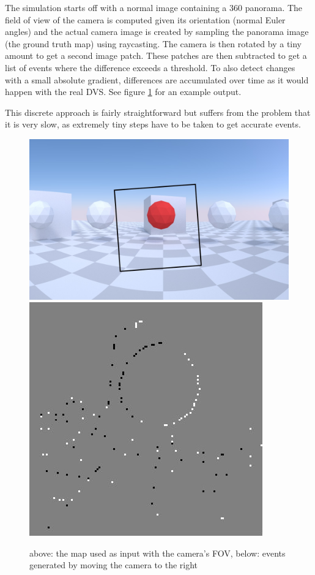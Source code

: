 The simulation starts off with a normal image containing a 360\textdegree{}
panorama. The field of view of the camera is computed given its orientation
(normal Euler angles) and the actual camera image is created by sampling the
panorama image (the ground truth map) using raycasting. The camera is then
rotated by a tiny amount to get a second image patch. These patches are then
subtracted to get a list of events where the difference exceeds a threshold. To
also detect changes with a small absolute gradient, differences are accumulated
over time as it would happen with the real DVS. See figure \ref{fig:simulation}
for an example output.

This discrete approach is fairly straightforward but suffers from the problem
that it is very slow, as extremely tiny steps have to be taken to get accurate
events.

\begin{figure}
\includegraphics[width=\linewidth]{images/simulation_raw.jpg}
\includegraphics[width=\linewidth]{images/simulation_events.jpg}
\caption{above: the map used as input with the camera's FOV, below: events generated by moving the camera to the right}
\label{fig:simulation}
\end{figure}
